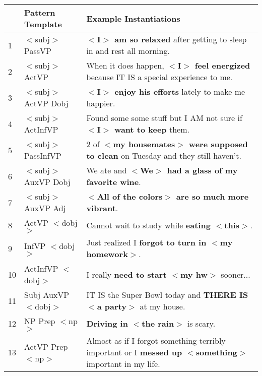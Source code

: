 \documentclass[11pt,letterpaper]{article}
\newcommand{\ra}[1]{\renewcommand{\arraystretch}{#1}}
\begin{document}
\begin{table}[t!bh]
\begin{small}
\centering
\ra{1.3}
\begin{tabular}{@{}p{0.1in}|p{1.1in}|p{1.4in}@{}}\toprule
\bf \cellcolor[gray]{0.9} & \bf \cellcolor[gray]{0.9} Pattern Template & \bf \cellcolor[gray]{0.9} Example Instantiations \\ \midrule
1 & $<$subj$>$ PassVP & {\bf $<$I$>$ am so relaxed} after getting to sleep in and rest all morning. \\ \midrule
2 &   $<$subj$>$ ActVP        & When it does happen, {\bf $<$I$>$ feel energized} because IT IS a special experience to me.\\ \midrule
3&    $<$subj$>$ ActVP Dobj   & {\bf $<$I$>$ enjoy his efforts} lately to make me happier.\\ \midrule
4&    $<$subj$>$ ActInfVP & Found some some stuff but I AM not sure if {\bf $<$I$>$ want to keep} them.  \\ \midrule
5&    $<$subj$>$ PassInfVP & 2 of {\bf $<$my housemates$>$ were supposed to clean} on Tuesday and they still haven't. \\ \midrule 
6&    $<$subj$>$ AuxVP Dobj & We ate and {\bf $<$We$>$ had a glass of my favorite wine}.
\\ \midrule
7&    $<$subj$>$ AuxVP Adj & {\bf $<$All of the colors$>$ are so much more vibrant}. \\ \midrule \midrule
8&    ActVP $<$dobj$>$ & Cannot wait to study while {\bf eating $<$this$>$}. \\ \midrule
9&    InfVP $<$dobj$>$ & Just realized I {\bf forgot to turn in $<$my homework$>$}.\\ \midrule
10&    ActInfVP $<$dobj$>$ & I really {\bf need to start $<$my hw$>$} sooner...\\ \midrule
 11&       Subj AuxVP $<$dobj$>$   & IT IS the Super Bowl today and {\bf THERE IS $<$a party$>$} at my house. \\ 
    \midrule \midrule
12&    NP Prep $<$np$>$  &  {\bf Driving in $<$the rain$>$} is scary.\\ \midrule
13&    ActVP Prep $<$np$>$ & Almost as if I forgot something terribly important or I {\bf messed up $<$something$>$} important in my life. \\ \midrule

\end{tabular}
\end{small}
\end{table}
\end{document}
